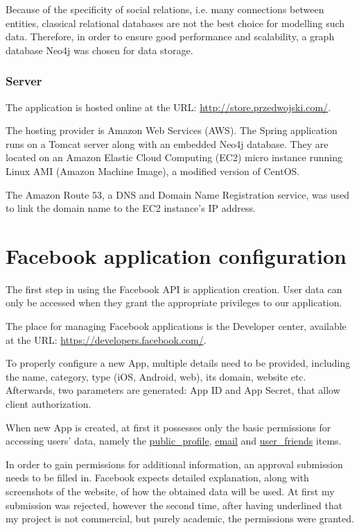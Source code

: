 \documentclass[12pt]{report}
\begin{document}
Because of the specificity of social relations, i.e. many connections between entities, classical relational databases are not the best choice for modelling such data. Therefore, in order to ensure good performance and scalability, a graph database Neo4j \cite{neo4j} was chosen for data storage.

\subsubsection{Server}

The application is hosted online at the URL: \url{http://store.przedwojski.com/}. 

The hosting provider is Amazon Web Services (AWS). The Spring application runs on a Tomcat server along with an embedded Neo4j database. They are located on an Amazon Elastic Cloud Computing (EC2) micro instance running Linux AMI (Amazon Machine Image), a modified version of CentOS.

The Amazon Route 53, a DNS and Domain Name Registration service, was used to link the domain name to the EC2 instance's IP address.


\section{Facebook application configuration}
The first step in using the Facebook API is application creation. User data can only be accessed when they grant the appropriate privileges to our application.

The place for managing Facebook applications is the Developer center, available at the URL: \url{https://developers.facebook.com/}.

To properly configure a new App, multiple details need to be provided, including the name, category, type (iOS, Android, web), its domain, website etc. Afterwards, two parameters are generated: App ID and App Secret, that allow client authorization.

When new App is created, at first it possesses only the basic permissions for accessing users' data, namely the \url{public_profile}, \url{email} and \url{user_friends} items.

In order to gain permissions for additional information, an approval submission needs to be filled in. Facebook expects detailed explanation, along with screenshots of the website, of how the obtained data will be used. At first my submission was rejected, however the second time, after having underlined that my project is not commercial, but purely academic, the permissions were granted.
\end{document}
